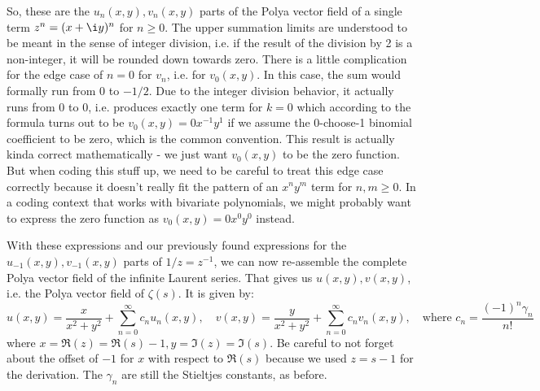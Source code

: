 \documentclass[12pt]{article}
\begin{document}
So, these are the $u_n(x,y), v_n(x,y)$ parts of the Polya vector field of a single term $z^n = (x + \i y)^n$ for $n \geq 0$. The upper summation limits are understood to be meant in the sense of integer division, i.e. if the result of the division by 2 is a non-integer, it will be rounded down towards zero. There is a little complication for the edge case of $n=0$ for $v_n$, i.e. for $v_0(x,y)$. In this case, the sum would formally run from $0$ to $-1/2$. Due to the integer division behavior, it actually runs from $0$ to $0$, i.e. produces exactly one term for $k=0$ which according to the formula turns out to be $v_0(x,y) = 0 x^{-1} y^1$ if we assume the 0-choose-1 binomial coefficient to be zero, which is the common convention. This result is actually kinda correct mathematically - we just want $v_0(x,y)$ to be the zero function. But when coding this stuff up, we need to be careful to treat this edge case correctly because it doesn't really fit the pattern of an $x^n y^m$ term for $n,m \geq 0$. In a coding context that works with bivariate polynomials, we might probably want to express the zero function as $v_0(x,y) = 0 x^0 y^0$ instead. 

With these expressions and our previously found expressions for the $u_{-1}(x,y), v_{-1}(x,y)$ parts of $1/z = z^{-1}$, we can now re-assemble the complete Polya vector field of the infinite Laurent series. That gives us $u(x,y), v(x,y)$, i.e. the Polya vector field of $\zeta(s)$. It is given by:
\begin{equation}
\label{Eq:PolyaFieldLaurent}	
\boxed{
 u(x,y) = \frac{x}{x^2 + y^2} + \sum_{n=0}^{\infty} c_n u_n(x,y), \quad
 v(x,y) = \frac{y}{x^2 + y^2} + \sum_{n=0}^{\infty} c_n v_n(x,y),  
}
\quad \text{where } c_n = \frac{(-1)^n \gamma_n}{n!}
\end{equation}
where $x = \Re(z) = \Re(s) - 1, y = \Im(z) = \Im(s)$. Be careful to not forget about the offset of $-1$ for $x$ with respect to $\Re(s)$ because we used $z = s-1$ for the derivation. The $\gamma_n$ are still the Stieltjes constants, as before.
\end{document}

